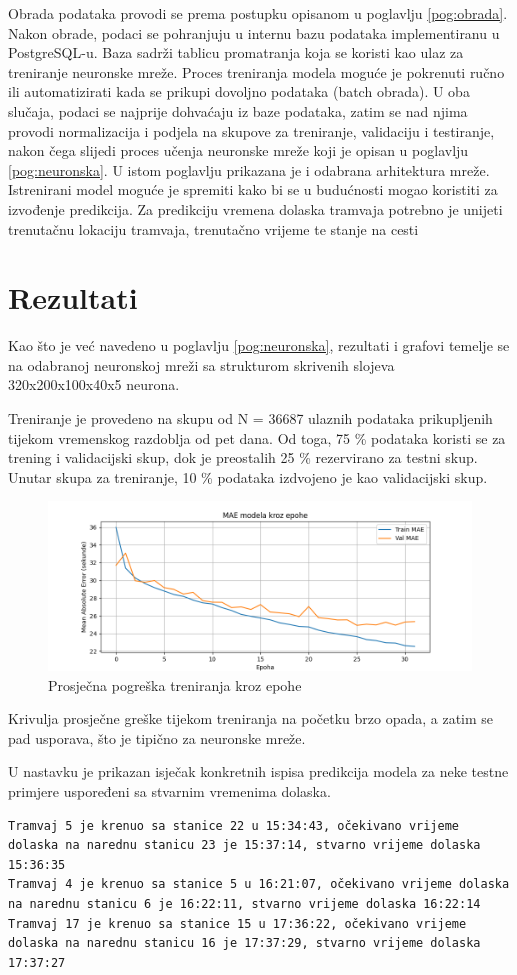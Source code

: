 \documentclass[seminarskirad]{fer}
\begin{document}
Obrada podataka provodi se prema postupku opisanom u poglavlju \ref{pog:obrada}. Nakon obrade, podaci se pohranjuju u internu bazu podataka implementiranu u PostgreSQL-u. Baza sadrži tablicu promatranja koja se koristi kao ulaz za treniranje neuronske mreže. Proces treniranja modela moguće je pokrenuti ručno ili automatizirati kada se prikupi dovoljno podataka (batch obrada). U oba slučaja, podaci se najprije dohvaćaju iz baze podataka, zatim se nad njima provodi normalizacija i podjela na skupove za treniranje, validaciju i testiranje, nakon čega slijedi proces učenja neuronske mreže koji je opisan u poglavlju \ref{pog:neuronska}. U istom poglavlju prikazana je i odabrana arhitektura mreže.
Istrenirani model moguće je spremiti kako bi se u budućnosti mogao koristiti za izvođenje predikcija. Za predikciju vremena dolaska tramvaja potrebno je unijeti trenutačnu lokaciju tramvaja, trenutačno vrijeme te stanje na cesti

\section{Rezultati}
Kao što je već navedeno u poglavlju \ref{pog:neuronska}, rezultati i grafovi temelje se na odabranoj neuronskoj mreži sa strukturom skrivenih slojeva 320x200x100x40x5 neurona. 

Treniranje je provedeno na skupu od N = 36687 ulaznih podataka prikupljenih tijekom vremenskog razdoblja od pet dana. Od toga, 75 \% podataka koristi se za trening i validacijski skup, dok je preostalih 25 \% rezervirano za testni skup. Unutar skupa za treniranje, 10 \% podataka izdvojeno je kao validacijski skup.
\begin{figure}[htb]
	\centering
	\includegraphics[width=0.8\linewidth]{Figures/mae_epoha.png}
	\caption{Prosječna pogreška treniranja kroz epohe}
	\label{fig:mae_epoha}
\end{figure}
Krivulja prosječne greške tijekom treniranja na početku brzo opada, a zatim se pad usporava, što je tipično za neuronske mreže.
\newpage

U nastavku je prikazan isječak konkretnih ispisa predikcija modela za neke testne primjere uspoređeni sa stvarnim vremenima dolaska.
\begin{lstlisting}
Tramvaj 5 je krenuo sa stanice 22 u 15:34:43, očekivano vrijeme dolaska na narednu stanicu 23 je 15:37:14, stvarno vrijeme dolaska 15:36:35
Tramvaj 4 je krenuo sa stanice 5 u 16:21:07, očekivano vrijeme dolaska na narednu stanicu 6 je 16:22:11, stvarno vrijeme dolaska 16:22:14
Tramvaj 17 je krenuo sa stanice 15 u 17:36:22, očekivano vrijeme dolaska na narednu stanicu 16 je 17:37:29, stvarno vrijeme dolaska 17:37:27
\end{lstlisting}
\end{document}
